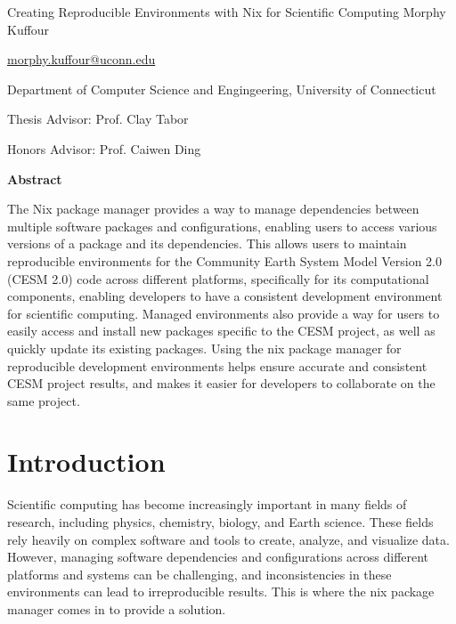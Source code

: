 \documentclass[
]{article}
\author{}
\date{\vspace{-2.5em}}
\newcommand\blankpage{%
    \null
    \thispagestyle{empty}%
    \addtocounter{page}{-1}%
    }
\begin{document}
\begin{titlepage}
\centering

\vspace*{\fill}
  {\Huge Creating Reproducible Environments with Nix for Scientific Computing}
\newline
\newline
Morphy Kuffour 

\href{mailto:morphy.kuffour@uconn.edu}{morphy.kuffour@uconn.edu}

Department of Computer Science and Engingeering, University of Connecticut

Thesis Advisor: Prof. Clay Tabor

Honors Advisor: Prof. Caiwen Ding
\vspace*{\fill}

\afterpage{\blankpage}
\end{titlepage}

\vspace*{\fill}
\begin{center}
  {\large \textbf{Abstract}}
\end{center}
The Nix package manager provides a way to manage dependencies between multiple software packages and configurations, enabling users to access various versions of a package and its dependencies. This allows users to maintain reproducible environments for the Community Earth System Model Version 2.0 (CESM 2.0) code across different platforms, specifically for its computational components, enabling developers to have a consistent development environment for scientific computing. Managed environments also provide a way for users to easily access and install new packages specific to the CESM project, as well as quickly update its existing packages. Using the nix package manager for reproducible development environments helps ensure accurate and consistent CESM project results, and makes it easier for developers to collaborate on the same project.
\vspace*{\fill}

\pagebreak


\hypertarget{introduction}{%
\section{Introduction}\label{introduction}}

Scientific computing has become increasingly important in many fields of research, including physics, chemistry, biology, and Earth science. These fields rely heavily on complex software and tools to create, analyze, and visualize data. However, managing software dependencies and configurations across different platforms and systems can be challenging, and inconsistencies in these environments can lead to irreproducible results. This is where the nix package manager comes in to provide a solution.
\end{document}
